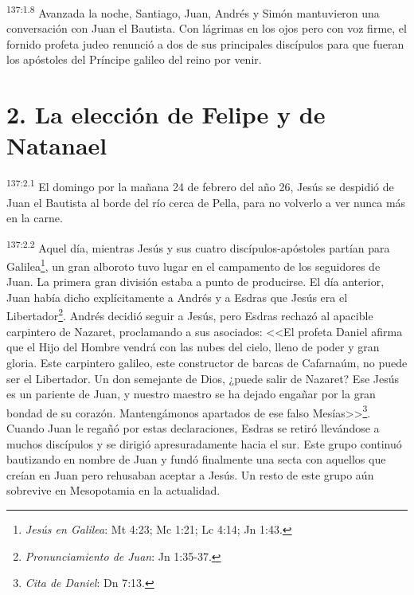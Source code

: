 \par 
\textsuperscript{137:1.8} Avanzada la noche, Santiago, Juan, Andrés y Simón mantuvieron una conversación con Juan el Bautista. Con lágrimas en los ojos pero con voz firme, el fornido profeta judeo renunció a dos de sus principales discípulos para que fueran los apóstoles del Príncipe galileo del reino por venir.

\section*{2. La elección de Felipe y de Natanael}
\par 
\textsuperscript{137:2.1} El domingo por la mañana 24 de febrero del año 26, Jesús se despidió de Juan el Bautista al borde del río cerca de Pella, para no volverlo a ver nunca más en la carne.

\par 
\textsuperscript{137:2.2} Aquel día, mientras Jesús y sus cuatro discípulos-apóstoles partían para Galilea\footnote{\textit{Jesús en Galilea}: Mt 4:23; Mc 1:21; Lc 4:14; Jn 1:43.}, un gran alboroto tuvo lugar en el campamento de los seguidores de Juan. La primera gran división estaba a punto de producirse. El día anterior, Juan había dicho explícitamente a Andrés y a Esdras que Jesús era el Libertador\footnote{\textit{Pronunciamiento de Juan}: Jn 1:35-37.}. Andrés decidió seguir a Jesús, pero Esdras rechazó al apacible carpintero de Nazaret, proclamando a sus asociados: <<El profeta Daniel afirma que el Hijo del Hombre vendrá con las nubes del cielo, lleno de poder y gran gloria. Este carpintero galileo, este constructor de barcas de Cafarnaúm, no puede ser el Libertador. Un don semejante de Dios, ¿puede salir de Nazaret? Ese Jesús es un pariente de Juan, y nuestro maestro se ha dejado engañar por la gran bondad de su corazón. Mantengámonos apartados de ese falso Mesías>>\footnote{\textit{Cita de Daniel}: Dn 7:13.}. Cuando Juan le regañó por estas declaraciones, Esdras se retiró llevándose a muchos discípulos y se dirigió apresuradamente hacia el sur. Este grupo continuó bautizando en nombre de Juan y fundó finalmente una secta con aquellos que creían en Juan pero rehusaban aceptar a Jesús. Un resto de este grupo aún sobrevive en Mesopotamia en la actualidad.

